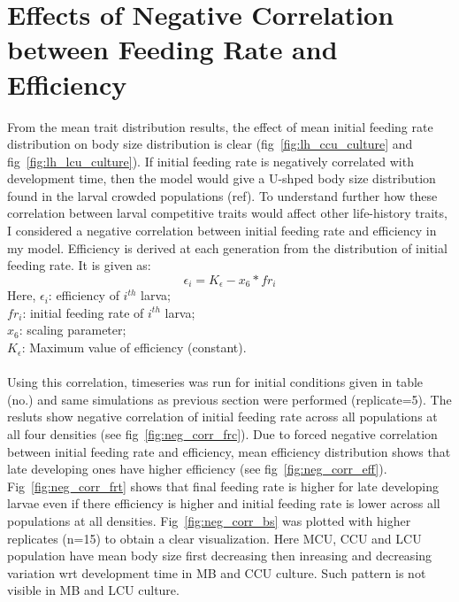 \section{Effects of Negative Correlation between Feeding Rate and Efficiency}
From the mean trait distribution results, the effect of mean initial feeding rate distribution on body size distribution is clear (fig~\ref{fig:lh_ccu_culture} and fig~\ref{fig:lh_lcu_culture}). If initial feeding rate is negatively correlated with development time, then the model would give a U-shped body size distribution found in the larval crowded populations (ref). To understand further how these correlation between larval competitive traits would affect other life-history traits, I considered a negative correlation between initial feeding rate and efficiency in my model. Efficiency is derived at each generation from the distribution of initial feeding rate. It is given as:
\[\epsilon_{i} = K_{\epsilon} - x_{6}*fr_{i}\]
Here,
$\epsilon_{i}$: efficiency of $i^{th}$ larva;\\
$fr_{i}$: initial feeding rate of $i^{th}$ larva;\\
$x_{6}$: scaling parameter;\\
$K_{\epsilon}$: Maximum value of efficiency (constant).\\\\
Using this correlation, timeseries was run for initial conditions given in table (no.) and same simulations as previous section were performed (replicate=5). The resluts show negative correlation of initial feeding rate across all populations at all four densities (see fig~\ref{fig:neg_corr_frc}). Due to forced negative correlation between initial feeding rate and efficiency, mean efficiency distribution shows that late developing ones have higher efficiency (see fig~\ref{fig:neg_corr_eff}). Fig~\ref{fig:neg_corr_frt} shows that final feeding rate is higher for late developing larvae even if there efficiency is higher and initial feeding rate is lower across all populations at all densities. Fig~\ref{fig:neg_corr_bs} was plotted with higher replicates (n=15) to obtain a clear visualization. Here MCU, CCU and LCU population have mean body size first decreasing then inreasing and decreasing variation wrt development time in MB and CCU culture. Such pattern is not visible in MB and LCU culture.
